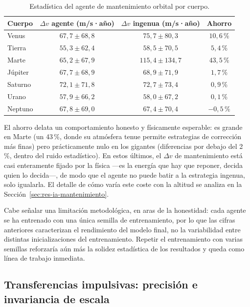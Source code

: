 \begin{table}[htbp]
  \centering
  \caption{Estadística del agente de mantenimiento orbital por cuerpo.}
  \label{tab:res-ia-keep-stats}
  \begin{tabular}{l c c c}
    \hline
    \textbf{Cuerpo} & {\boldmath $\Delta v$} \textbf{ agente (m/s·año)} & {\boldmath $\Delta v$} \textbf{ ingenua (m/s·año)} & \textbf{Ahorro} \\
    \hline
    Venus   & $67{,}7 \pm 68{,}8$ & $75{,}7 \pm 80{,}3$   & $10{,}6$\,\%  \\
    Tierra  & $55{,}3 \pm 62{,}4$ & $58{,}5 \pm 70{,}5$   & $5{,}4$\,\%   \\
    Marte   & $65{,}2 \pm 67{,}9$ & $115{,}4 \pm 134{,}7$ & $43{,}5$\,\% \\
    Júpiter & $67{,}7 \pm 68{,}9$ & $68{,}9 \pm 71{,}9$   & $1{,}7$\,\%   \\
    Saturno & $72{,}1 \pm 71{,}8$ & $72{,}7 \pm 73{,}4$   & $0{,}9$\,\%   \\
    Urano   & $57{,}9 \pm 66{,}2$ & $58{,}0 \pm 67{,}2$   & $0{,}1$\,\%   \\
    Neptuno & $67{,}8 \pm 69{,}0$ & $67{,}4 \pm 70{,}4$   & $-0{,}5$\,\% \\
    \hline
  \end{tabular}
\end{table}

El ahorro delata un comportamiento honesto y físicamente esperable: es grande en Marte (un 43\,\%, donde su atmósfera tenue permite estrategias de corrección más finas) pero prácticamente nulo en los gigantes (diferencias por debajo del 2\,\%, dentro del ruido estadístico). En estos últimos, el $\Delta v$ de mantenimiento está casi enteramente fijado por la física ---es la energía que hay que reponer, decida quien lo decida---, de modo que el agente no puede batir a la estrategia ingenua, solo igualarla. El detalle de cómo varía este coste con la altitud se analiza en la Sección~\ref{sec:res-ia-mantenimiento}.

Cabe señalar una limitación metodológica, en aras de la honestidad: cada agente se ha entrenado con una única semilla de entrenamiento, por lo que las cifras anteriores caracterizan el rendimiento del modelo final, no la variabilidad entre distintas inicializaciones del entrenamiento. Repetir el entrenamiento con varias semillas reforzaría aún más la solidez estadística de los resultados y queda como línea de trabajo inmediata.

\subsection{Transferencias impulsivas: precisión e invariancia de escala}
\label{sec:res-ia-transfer}


